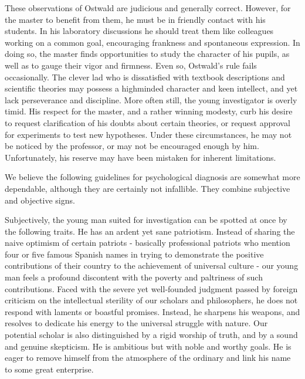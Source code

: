 \documentclass{article}
\begin{document}
These observations of Ostwald are judicious and generally correct. However, for the master to benefit from them, he must be in friendly contact with his students. In his laboratory discussions he should treat them like colleagues working on a common goal, encouraging frankness and spontaneous expression. In doing so, the master finds opportunities to study the character of his pupils, as well as to gauge their vigor and firmness. Even so, Ostwald’s rule fails occasionally. The clever lad who is dissatisfied with textbook descriptions and scientific theories may possess a highminded character and keen intellect, and yet lack perseverance and discipline. More often still, the young investigator is overly timid. His respect for the master, and a rather winning modesty, curb his desire to request clarification of his doubts about certain theories, or request approval for experiments to test new hypotheses. Under these circumstances, he may not be noticed by the professor, or may not be encouraged enough by him. Unfortunately, his reserve may have been mistaken for inherent limitations.

We believe the following guidelines for psychological diagnosis are somewhat more dependable, although they are certainly not infallible. They combine subjective and objective signs.

Subjectively, the young man suited for investigation can be spotted at once by the following traits. He has an ardent yet sane patriotism. Instead of sharing the naive optimism of certain patriots - basically professional patriots who mention four or five famous Spanish names in trying to demonstrate the positive contributions of their country to the achievement of universal culture - our young man feels a profound discontent with the poverty and paltriness of such contributions. Faced with the severe yet well-founded judgment passed by foreign criticism on the intellectual sterility of our scholars and philosophers, he does not respond with laments or boastful promises. Instead, he sharpens his weapons, and resolves to dedicate his energy to the universal struggle with nature. Our potential scholar is also distinguished by a rigid worship of truth, and by a sound and genuine skepticism. He is ambitious but with noble and worthy goals. He is eager to remove himself from the atmosphere of the ordinary and link his name to some great enterprise.
\end{document}
